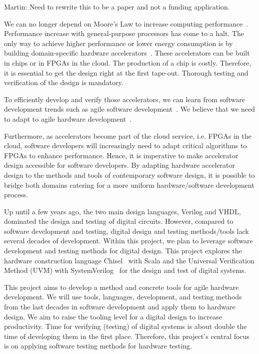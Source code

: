 \documentclass[conference]{IEEEtran}
\newcommand{\martin}[1]{{\color{blue} Martin: #1}}
\begin{document}
\martin{Need to rewrite this to be a paper and not a funding application.}

We can no longer depend on Moore's Law to increase computing performance~\cite{dark-silicon:2011}.
Performance increase with general-purpose processors has come to a halt.
The only way to achieve higher performance or lower energy consumption
is by building domain-specific hardware accelerators~\cite{domain-hw-acc:2020}.
These accelerators can be built in chips or in FPGAs in the cloud.
The production of a chip is costly. Therefore, it is essential to get
the design right at the first tape-out. Thorough testing and verification of the design is mandatory.

To efficiently develop and verify those accelerators, we can learn from software development trends such as agile software development~\cite{agile:manifesto}.
We believe that we need to adapt to agile hardware development~\cite{henn-patt:turing:2019}.

Furthermore, as accelerators become part of the cloud service, i.e. FPGAs in the cloud,
software developers will increasingly need to adapt critical algorithms to FPGAs to enhance performance.
Hence, it is imperative to make accelerator design accessible for software developers.
By adapting hardware accelerator design to the methods and tools of contemporary software design,
it is possible to bridge both domains catering for a more uniform hardware/software development process.

Up until a few years ago, the two main design languages, Verilog and VHDL, dominated the
design and testing of digital circuits.
However, compared to software development and testing, digital design and testing methods/tools 
lack several decades of development. Within this project, we plan to
leverage software development and testing methods for digital design.
This project explores the hardware construction language Chisel~\cite{chisel:dac2012} with Scala
and the Universal Verification Method (UVM) with SystemVerilog~\cite{SystemVerilog} for
the design and test of digital systems.

This project aims to develop a method and concrete tools for agile hardware development.
We will use tools, languages, development, and testing methods from the last decades in
software development and apply them to hardware design.
We aim to raise the tooling level for a digital design to increase productivity.
Time for verifying (testing) of digital systems is about double the time of developing
them in the first place.
Therefore, this project's central focus is on applying software
testing methods for hardware testing.
\end{document}
